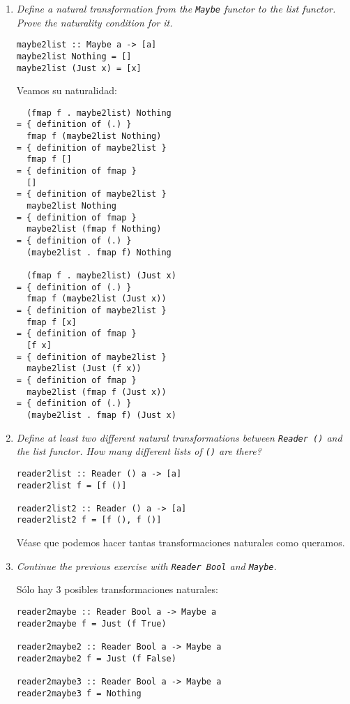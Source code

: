 \documentclass[11pt]{article}
\begin{document}
\begin{enumerate}
\item \textit{Define a natural transformation from the \texttt{Maybe} functor to the list functor. Prove the naturality condition for it.}

\begin{verbatim}
maybe2list :: Maybe a -> [a]
maybe2list Nothing = []
maybe2list (Just x) = [x]
\end{verbatim}

Veamos su naturalidad:
\begin{verbatim}
  (fmap f . maybe2list) Nothing
= { definition of (.) }
  fmap f (maybe2list Nothing)
= { definition of maybe2list }
  fmap f []
= { definition of fmap }
  []
= { definition of maybe2list }
  maybe2list Nothing
= { definition of fmap }
  maybe2list (fmap f Nothing)
= { definition of (.) }
  (maybe2list . fmap f) Nothing

  (fmap f . maybe2list) (Just x)
= { definition of (.) }
  fmap f (maybe2list (Just x))
= { definition of maybe2list }
  fmap f [x]
= { definition of fmap }
  [f x]
= { definition of maybe2list }
  maybe2list (Just (f x))
= { definition of fmap }
  maybe2list (fmap f (Just x))
= { definition of (.) }
  (maybe2list . fmap f) (Just x)
\end{verbatim}

\item \textit{Define at least two different natural transformations between \texttt{Reader ()} and the list functor. How many different lists of \texttt{()} are there?}

\begin{lstlisting}
reader2list :: Reader () a -> [a]
reader2list f = [f ()]

reader2list2 :: Reader () a -> [a]
reader2list2 f = [f (), f ()]
\end{lstlisting}

Véase que podemos hacer tantas transformaciones naturales como queramos.

\item \textit{Continue the previous exercise with \texttt{Reader Bool} and \texttt{Maybe}.}

Sólo hay $3$ posibles transformaciones naturales:

\begin{lstlisting}
reader2maybe :: Reader Bool a -> Maybe a
reader2maybe f = Just (f True)

reader2maybe2 :: Reader Bool a -> Maybe a
reader2maybe2 f = Just (f False)

reader2maybe3 :: Reader Bool a -> Maybe a
reader2maybe3 f = Nothing
\end{lstlisting}

\end{enumerate}
\end{document}
